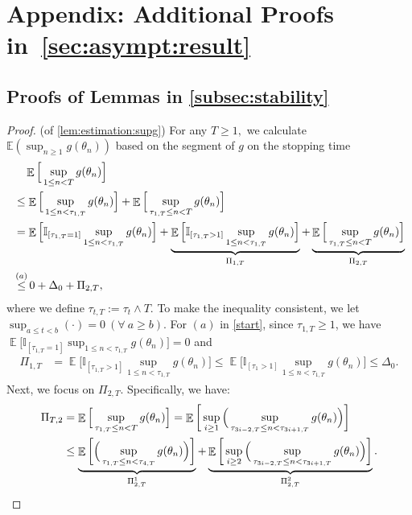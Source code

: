 \documentclass[standalone]{article}
\newcommand{\E}{\mathbb{E}}
\newcommand{\I}{\mathbb{I}}
\DeclareMathOperator{\Expect}{\mathbb{E}}
\begin{document}
\section{Appendix: Additional Proofs in~\cref{sec:asympt:result}}\label{appendix:add:proof}
\subsection{Proofs of Lemmas in \cref{subsec:stability}}
\begin{proof}(of \cref{lem:estimation:supg})
For any $T\geq 1,$ we calculate \(\E\left(\sup_{n \ge 1} g(\theta_{n})\right)\) based on the segment of $g$ on the stopping time
\begin{align}\label{start}
  &\quad \Expect\Big[\sup_{1\le n<T}g(\theta_{n})\Big] \notag \\&\le \Expect\Big[\sup_{1\le n< \tau_{1,T}}g(\theta_{n})\Big]  +\Expect\Big[\sup_{\tau_{1,T}\le n<T}g(\theta_{n})\Big]\notag\\&=\Expect\Big[\I_{[\tau_{1,T}=1]}\sup_{1\le n< \tau_{1,T}}g(\theta_{n})\Big]+\underbrace{\Expect\Big[\I_{[\tau_{1,T}>1]}\sup_{1\le n< \tau_{1,T}}g(\theta_{n})\Big]}_{\Pi_{1, T}} +\underbrace{\Expect\Big[\sup_{\tau_{1,T}\le n< T}g(\theta_{n})\Big]}_{\Pi_{2,T}}\notag\\&\mathop{\le}^{(a)}0+\Delta_{0}+\Pi_{2,T},
\end{align}
where we define $\tau_{t,T}:=\tau_{t}\wedge T.$ 
To make the inequality consistent, we let $\sup_{a \le t < b}(\cdot) = 0 \ (\forall\ a \ge b).$ For $(a)$ in \cref{start}, since $\tau_{1,T} \geq 1$, we have  $\Expect\Big[\I_{[\tau_{1,T}=1]}\sup_{1\le n< \tau_{1,T}}g(\theta_{n})\Big]=0$ and
\begin{align*}
\Pi_{1, T}&=\Expect\Big[\I_{[\tau_{1,T}>1]}\sup_{1\le n< \tau_{1,T}}g(\theta_{n})\Big]\le\Expect\Big[\I_{[\tau_{1}>1]}\sup_{1\le n< \tau_{1,T}}g(\theta_{n})\Big]\le\Delta_{0}.%
\end{align*}
Next, we focus on  $\Pi_{2,T}$. Specifically, we have:
\begin{align}\label{inequ:xt2}
\Pi_{T,2}&=\Expect\Big[\sup_{\tau_{1,T}\le n<T}g(\theta_{n})\Big]=\Expect\bigg[\sup_{i\ge 1}\Big(\sup_{\tau_{3i-2,T}\le n<\tau_{3i+1,T}}g(\theta_n)\Big)\bigg]\notag\\&\le\underbrace{\Expect\bigg[\Big(\sup_{\tau_{1,T}\le n<\tau_{4,T}}g(\theta_n)\Big)\bigg]}_{\Pi_{2,T}^1}+\underbrace{\Expect\bigg[\sup_{i\ge 2}\Big(\sup_{\tau_{3i-2,T}\le n<\tau_{3i+1,T}}g(\theta_n)\Big)\bigg]}_{\Pi_{2,T}^2}.
\end{align}

\end{proof}
\end{document}
